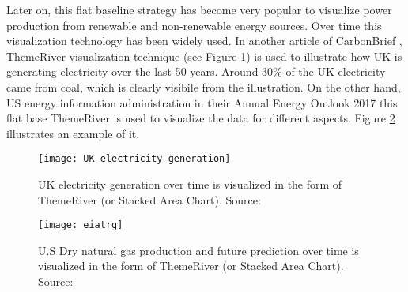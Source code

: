 Later on, this flat baseline strategy has become very popular to visualize power production from renewable and non-renewable energy sources. Over time this visualization technology has been widely used. In another article of CarbonBrief \cite{cbuk2016}, ThemeRiver visualization technique (see Figure \ref{fig:ukecg}) is used to illustrate how UK is generating electricity over the last 50 years. Around 30\% of the UK electricity came from coal, which is clearly visibile from the illustration. On the other hand, US energy information administration in their Annual Energy Outlook 2017 \cite{eiagov} this flat base ThemeRiver is used to visualize the data for different aspects. Figure \ref{fig:eiatrgh} illustrates an example of it. 

\begin{figure}
  \begin{center}
    \texttt{[image: UK-electricity-generation]}
    \caption[UK electricity generation over time]{UK electricity generation over time is visualized in the form of ThemeRiver (or Stacked Area Chart). Source:\cite{cbuk2016}}
    \label{fig:ukecg}
  \end{center}
\end{figure}

\begin{figure} [H]
  \begin{center}
    \texttt{[image: eiatrg]}
    \caption[U.S Dry natural gas production and future prediction over time]{U.S Dry natural gas production and future prediction over time is visualized in the form of ThemeRiver (or Stacked Area Chart). Source:\cite{eiagov}}
    \label{fig:eiatrgh}
  \end{center}
\end{figure}



